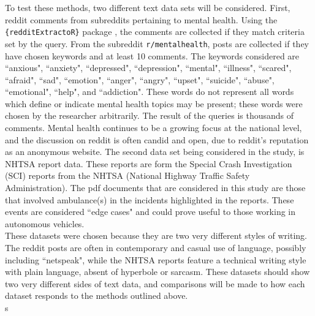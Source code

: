 To test these methods, two different text data sets will be considered. First, reddit comments from subreddits pertaining to mental health. Using the \texttt{\{redditExtractoR\}} package \cite{rivera2015package}, the comments are collected if they match criteria set by the query. From the subreddit \texttt{r/mentalhealth}, posts are collected if they have chosen keywords and at least 10 comments. The keywords considered are ``anxious", ``anxiety", ``depressed", ``depression", ``mental", ``illness", ``scared", ``afraid", ``sad", ``emotion", ``anger", ``angry", ``upset", ``suicide", ``abuse", ``emotional", ``help", and ``addiction". These words do not represent all words which define or indicate mental health topics may be present; these words were chosen by the researcher arbitrarily. The result of the queries is thousands of comments. Mental health continues to be a growing focus at the national level, and the discussion on reddit is often candid and open, due to reddit's reputation as an anonymous website. The second data set being considered in the study, is NHTSA report data. These reports are form the Special Crash Investigation (SCI) reports from the NHTSA (National Highway Traffic Safety Administration). The pdf documents that are considered in this study are those that involved ambulance(s) in the incidents highlighted in the reports. These events are considered ``edge cases" and could prove useful to those working in autonomous vehicles. \\
These datasets were chosen because they are two very different styles of writing. The reddit posts are often in contemporary and casual use of language, possibly including ``netspeak", while the NHTSA reports feature a technical writing style with plain language, absent of hyperbole or sarcasm. These datasets should show two very different sides of text data, and comparisons will be made to how each dataset responds to the methods outlined above. \\s